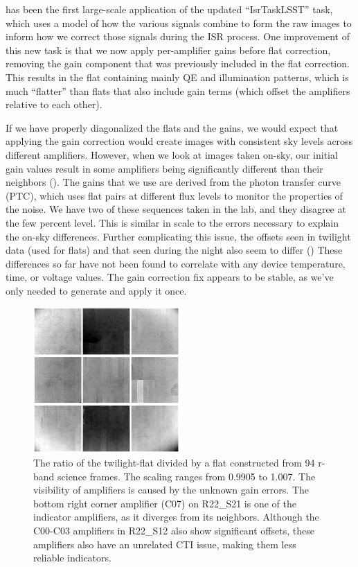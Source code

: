 \ComCam has been the first large-scale application of the updated ``IsrTaskLSST'' task, which uses a model of how the various signals combine to form the raw images to inform how we correct those signals during the ISR process.
One improvement of this new task is that we now apply per-amplifier gains before flat correction, removing the gain component that was previously included in the flat correction.
This results in the flat containing mainly QE and illumination patterns, which is much ``flatter'' than flats that also include gain terms (which offset the amplifiers relative to each other).


If we have properly diagonalized the flats and the gains, we would expect that applying the gain correction would create images with consistent sky levels across different amplifiers.
However, when we look at images taken on-sky, our initial gain values result in some amplifiers being
significantly different than their neighbors ().
The gains that we use are derived from the photon transfer curve (PTC), which uses flat pairs at different flux levels to monitor the properties of the noise.
We have two of these sequences taken in the lab, and they disagree at the few percent level.
This is similar in scale to the errors necessary to explain the on-sky differences.
Further complicating this issue, the offsets seen in twilight data (used for flats) and that seen during the
night also seem to differ ()
These differences so far have not been found to correlate with any device temperature, time, or voltage values.
The gain correction fix appears to be stable, as we've only needed to generate and apply it once.

\begin{figure}
  \begin{center}
  \includegraphics[width=0.5\textwidth]{figures/isr-f06-twilight_flat_ratio.png}
  \caption{The ratio of the twilight-flat divided by a flat constructed from 94 r-band science frames.  The
    scaling ranges from 0.9905 to 1.007.  The visibility of amplifiers is caused by the unknown gain errors.
    The bottom right corner amplifier (C07) on R22\_S21 is one of the indicator amplifiers, as it diverges
    from its neighbors.  Although the C00-C03 amplifiers in R22\_S12 also show significant offsets, these
    amplifiers also have an unrelated CTI issue, making them less reliable indicators.}
  \label{fig:raft_flat_ratio}
  \end{center}
\end{figure}

